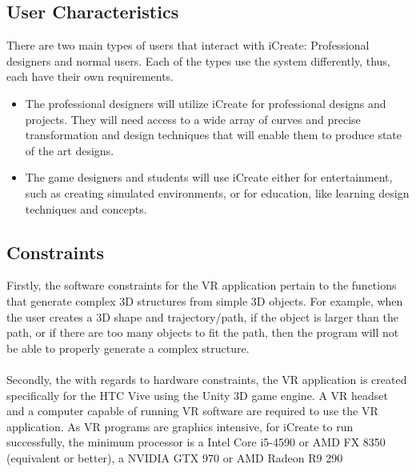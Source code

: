 \documentclass[letterpaper,draftclsnofoot,onecolumn,10 pt,compsoc]{IEEEtran}
\begin{document}
\subsection{User Characteristics}
There are two main types of users that interact with iCreate: Professional designers and normal users. Each of the types use the system differently, thus, each have their own requirements. 

\begin{itemize}
\item The professional designers will utilize iCreate for professional designs and projects. They will need access to a wide array of curves and precise transformation and design techniques that will enable them to produce state of the art designs.
\item The game designers and students will use iCreate either for entertainment, such as creating simulated environments, or for education, like learning design techniques and concepts.
\end{itemize}

\subsection{Constraints}

\noindent Firstly, the software constraints for the VR application pertain to the functions that generate complex 3D structures from simple 3D objects. For example, when the user creates a 3D shape and trajectory/path, if the object is larger than the path, or if there are too many objects to fit the path, then the program will not be able to properly generate a complex structure.
\\ \\
\noindent Secondly, the with regards to hardware constraints, the VR application is created specifically for the HTC Vive using the Unity 3D game engine. A VR headset and a computer capable of running VR software are required to use the VR application. As VR programs are graphics intensive,  for iCreate to run successfully, the minimum processor is a Intel Core i5-4590 or AMD FX 8350 (equivalent or better), a NVIDIA GTX 970 or AMD Radeon R9 290 
\end{document}
